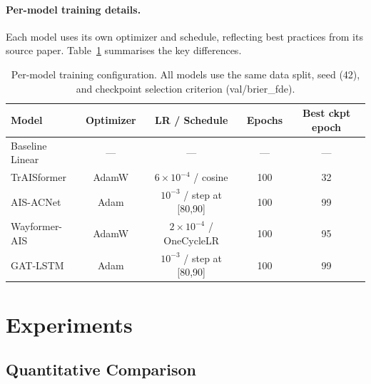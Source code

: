 \documentclass[12pt, a4paper]{article}
\begin{document}
\paragraph{Per-model training details.}
Each model uses its own optimizer and schedule, reflecting best practices
from its source paper.  Table~\ref{tab:training_summary} summarises the
key differences.

\begin{table}[H]
  \centering
  \caption{Per-model training configuration. All models use the same
  data split, seed (42), and checkpoint selection criterion (val/brier\_fde).}
  \label{tab:training_summary}
  \begin{tabular}{lcccc}
    \toprule
    \textbf{Model} & \textbf{Optimizer} & \textbf{LR / Schedule}
                   & \textbf{Epochs} & \textbf{Best ckpt epoch} \\
    \midrule
    Baseline Linear & — & — & — & — \\
    TrAISformer     & AdamW & $6\!\times\!10^{-4}$ / cosine & 100 & 32 \\
    AIS-ACNet       & Adam  & $10^{-3}$ / step at [80,90]   & 100 & 99 \\
    Wayformer-AIS   & AdamW & $2\!\times\!10^{-4}$ / OneCycleLR & 100 & 95 \\
    GAT-LSTM        & Adam  & $10^{-3}$ / step at [80,90]       & 100 & 99 \\
    \bottomrule
  \end{tabular}
\end{table}

  \section{Experiments}
  \label{sec:experiments}

  \subsection{Quantitative Comparison}
\end{document}
